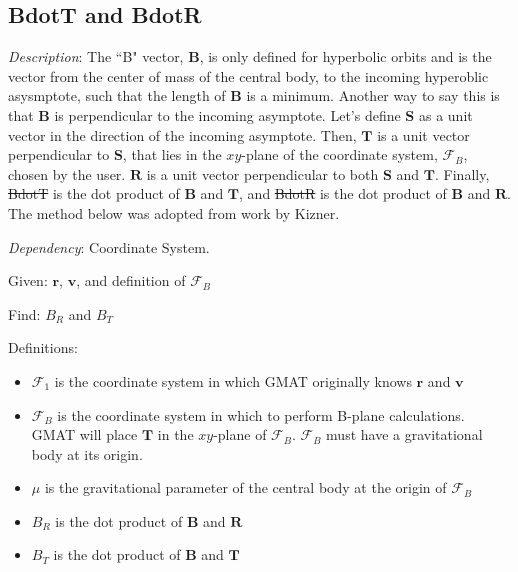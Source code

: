 \subsection{BdotT and BdotR}  

\noindent \textit{Description}: The ``B" vector, $\mathbf{B}$, is
only defined for hyperbolic orbits and is the vector from the center
of mass of the central body, to the incoming hyperoblic asysmptote,
such that the length of $\mathbf{B}$ is a minimum. Another way to
say this is that $\mathbf{B}$ is perpendicular to the incoming
asymptote.   Let's define $\mathbf{S}$ as a unit vector in the
direction of the incoming asymptote.  Then, $\mathbf{T}$ is a unit
vector perpendicular to $\mathbf{S}$, that lies in the $xy$-plane of
the coordinate system, $\mathcal{F}_B$, chosen by the user.
$\mathbf{R}$ is a unit vector perpendicular to both $\mathbf{S}$ and
$\mathbf{T}$. Finally, \st{BdotT} is the dot product of $\mathbf{B}$
and $\mathbf{T}$, and \st{BdotR} is the dot product of $\mathbf{B}$
and $\mathbf{R}$. The method below was adopted from work by
Kizner\cite{Kizner:59}.

\noindent \textit{Dependency}:  Coordinate System.

\noindent Given:  $\mathbf{r}$, $\mathbf{v}$, and definition of
$\mathcal{F}_B$

\noindent Find:  $B_R$ and $B_T$

\noindent Definitions:
\begin{itemize}
     \item $\mathcal{F}_1$ is the coordinate system in which GMAT originally knows
     $\mathbf{r}$ and $\mathbf{v}$
     \item $\mathcal{F}_B$ is the coordinate system in which to perform B-plane
     calculations.  GMAT will place $\mathbf{T}$ in the $xy$-plane
     of  $\mathcal{F}_B$.  $\mathcal{F}_B$ must have a gravitational
     body at its origin.
     \item $\mu$ is the gravitational parameter of the central body
     at the origin of $\mathcal{F}_B$
     \item $B_R$ is the dot product of $\mathbf{B}$ and
     $\mathbf{R}$
     \item $B_T$ is the dot product of $\mathbf{B}$ and
     $\mathbf{T}$
\end{itemize}



